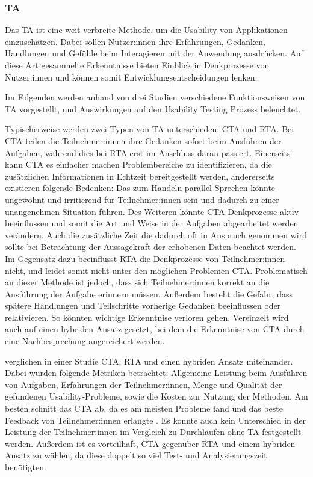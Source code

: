 \parencite{barnumUsabilityTesting2021}

\subsubsection{\acl{TA}}
Das \ac{TA} ist eine weit verbreite Methode, um die Usability von Applikationen einzuschätzen. Dabei
sollen Nutzer:innen ihre Erfahrungen, Gedanken, Handlungen und Gefühle beim Interagieren mit der
Anwendung ausdrücken. Auf diese Art gesammelte Erkenntnisse  bieten Einblick in
Denkprozesse von Nutzer:innen und können somit Entwicklungsentscheidungen lenken.
\parencite{alhadretiRethinkingThinking2018}

Im Folgenden werden anhand von drei Studien verschiedene Funktionsweisen von \ac{TA} vorgestellt,
und Auswirkungen auf den Usability Testing Prozess beleuchtet.

Typischerweise werden zwei Typen von \ac{TA} unterschieden: \ac{CTA} und \ac{RTA}. Bei \ac{CTA}
teilen die Teilnehmer:innen ihre Gedanken sofort beim Ausführen der Aufgaben, während dies bei
\ac{RTA} erst im Anschluss daran passiert. Einerseits kann \ac{CTA} es einfacher machen
Problembereiche zu identifizieren, da die zusätzlichen Informationen in Echtzeit bereitgestellt
werden, andererseits existieren folgende Bedenken: Das zum Handeln parallel Sprechen könnte
ungewohnt und irritierend für Teilnehmer:innen sein und dadurch zu einer unangenehmen Situation
führen. Des Weiteren könnte \ac{CTA} Denkprozesse aktiv beeinflussen und somit die Art und Weise in
der Aufgaben abgearbeitet werden verändern. Auch die zusätzliche Zeit die dadurch oft in Anspruch
genommen wird sollte bei Betrachtung der Aussagekraft der erhobenen Daten beachtet werden.  Im Gegensatz dazu beeinflusst \ac{RTA} die Denkprozesse von Teilnehmer:innen nicht, und
leidet somit nicht unter den möglichen Problemen \ac{CTA}. Problematisch an dieser Methode ist
jedoch, dass sich Teilnehmer:innen korrekt an die Ausführung der Aufgabe erinnern müssen. Außerdem
besteht die Gefahr, dass spätere Handlungen und Teilschritte vorherige Gedanken beeinflussen oder
relativieren. So könnten wichtige Erkenntnise verloren gehen. Vereinzelt wird auch auf einen
hybriden Ansatz gesetzt, bei dem die Erkenntnise von \ac{CTA} durch eine Nachbesprechung
angereichert werden. \cite{alhadretiRethinkingThinking2018}

\textcite{alhadretiRethinkingThinking2018} verglichen in einer Studie \ac{CTA}, \ac{RTA} und einen
hybriden Ansatz miteinander. Dabei wurden folgende Metriken betrachtet: Allgemeine Leistung beim
Ausführen von Aufgaben, Erfahrungen der Teilnehmer:innen, Menge und Qualität der gefundenen
Usability-Probleme, sowie die Kosten zur Nutzung der Methoden. Am besten schnitt das \acl{CTA} ab,
da es am meisten Probleme fand und das beste Feedback von Teilnehmer:innen erlangte
. Es konnte auch kein Unterschied in der Leistung der Teilnehmer:innen im Vergleich
zu Durchläufen ohne \ac{TA} festgestellt werden. Außerdem ist es vorteilhaft, \ac{CTA} gegenüber
\ac{RTA} und einem hybriden Ansatz zu wählen, da diese doppelt so viel Test- und Analysierungszeit
benötigten.
\parencite{alhadretiRethinkingThinking2018}

